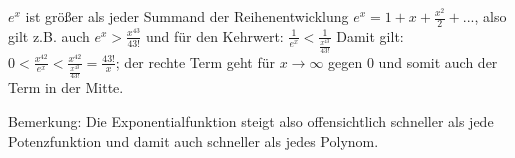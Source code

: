 
\item

$e^x$ ist größer als jeder Summand der Reihenentwicklung $e^x=1+x+\frac{x^2}{2}+...$, also gilt z.B. auch $e^x > \frac{x^{43}}{43!}$  und für den Kehrwert: $\frac{1}{e^x} < \frac{1}{\frac{x^{43}}{43!}}$
Damit gilt: $0< \frac{x^{42}}{e^x}< \frac{x^{42}}{\frac{x^{43}}{43!}}   =\frac{43!}{x}$; der rechte Term geht für $x\rightarrow\infty$ gegen 0 und somit auch der Term in der Mitte.

Bemerkung: Die Exponentialfunktion steigt also offensichtlich schneller als jede Potenzfunktion und damit auch schneller als jedes Polynom.

